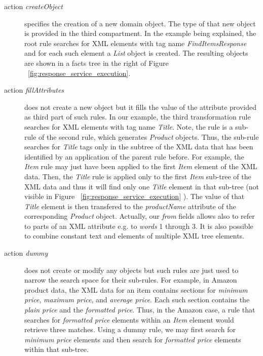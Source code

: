 \begin{description}
	\item[action \emph{createObject}] specifies the creation of a new domain object. The type of that new object is provided in the third compartment. In the example being explained, the root rule searches for XML elements with tag name \emph{FindItemsResponse} and for each such element a \emph{List} object is created. The resulting objects are shown in a facts tree in the right of Figure ~\ref{fig:response_service_execution}.
	\item[action \emph{fillAttributes}] does not create a new object but it fills the value of the attribute provided as third part of such rules. In our example, the third transformation rule searches for XML elements with tag name \emph{Title}. Note, the rule is a sub-rule of the second rule, which generates \emph{Product} objects. Thus, the sub-rule searches for \emph{Title} tags only in the subtree of the XML data that has been identified by an application of the parent rule before. For example, the \emph{Item} rule may just have been applied to the first \emph{Item} element of the XML data. Then, the \emph{Title} rule is applied only to the first \emph{Item} sub-tree of the XML data and thus it will find only one \emph{Title} element in that sub-tree (not visible in Figure ~\ref{fig:response_service_execution} ). The value of that \emph{Title} element is then transfered to the \emph{productName} attribute of the corresponding \emph{Product} object. Actually, our \textit{from} fields allows also to refer to parts of an XML attribute e.g. to \textit{words} 1 through 3. It is also possible to combine constant text and elements of multiple XML tree elements. 
	\item[action \emph{dummy}] does not create or modify any objects but such rules are just used to narrow the search space for their sub-rules. For example, in Amazon product data, the XML data for an item contains sections for \emph{minimum price}, \emph{maximum price}, and \emph{average price}. Each such section contains the \emph{plain price} and the \emph{formatted price}. Thus, in the Amazon case, a rule that searches for \emph{formatted price} elements within an \emph{Item} element would retrieve three matches. Using a dummy rule, we may first search for \emph{minimum price} elements and then search for \emph{formatted price} elements within that sub-tree.
\end{description}

